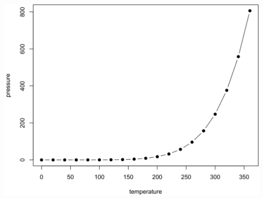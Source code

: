 \documentclass[
]{book}
\theoremstyle{definition}
\theoremstyle{definition}
\theoremstyle{definition}
\theoremstyle{definition}
\theoremstyle{remark}
\begin{document}
\includegraphics{./_main_files/figure-html/nice-fig-1.png}

  
\end{document}
